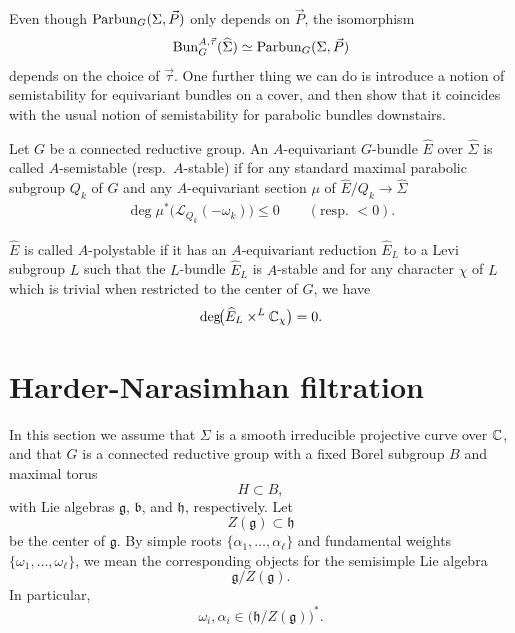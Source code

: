 \documentclass[12pt]{article}
\begin{document}
Even though \(\operatorname{Parbun}_G(\Sigma,\vec P)\) only depends on \(\vec P\), the isomorphism
\[
\operatorname{Bun}^{A,\vec\tau}_G(\widehat\Sigma)
\simeq
\operatorname{Parbun}_G(\Sigma,\vec P)
\]
depends on the choice of \(\vec\tau\). One further thing we can do is introduce a notion of semistability for equivariant bundles on a cover, and then show that it coincides with the usual notion of semistability for parabolic bundles downstairs. 

\begin{definition}
Let $G$ be a connected reductive group. An $A$-equivariant $G$-bundle $\widehat E$ over $\widehat\Sigma$ is called $A$-semistable (resp.\ $A$-stable) if for any standard maximal parabolic subgroup $Q_k$ of $G$ and any $A$-equivariant section $\mu$ of $\widehat E/Q_k \to \widehat\Sigma$ \begin{align*}
\deg \mu^*\bigl(\mathcal L_{Q_k}(-\omega_k)\bigr) \leq 0
\qquad\left(\text{resp.\ } < 0\right).
\end{align*}

$\widehat E$ is called $A$-polystable if it has an $A$-equivariant reduction $\widehat E_L$ to a Levi subgroup $L$ such that the $L$-bundle $\widehat E_L$ is $A$-stable and for any character $\chi$ of $L$ which is trivial when restricted to the center of $G$, we have
\[
\deg\!\bigl(\widehat E_L \times^L \mathbb{C}_\chi\bigr)=0.
\]
\end{definition}

\section{Harder-Narasimhan filtration}
In this section we assume that \(\Sigma\) is a smooth irreducible projective curve over \(\mathbb{C}\), and that \(G\) is a connected reductive group with a fixed Borel subgroup \(B\) and maximal torus
\[
H\subset B,
\]
with Lie algebras \(\mathfrak g\), \(\mathfrak b\), and \(\mathfrak h\), respectively. Let
\[
Z(\mathfrak g)\subset \mathfrak h
\]
be the center of \(\mathfrak g\). By simple roots \(\{\alpha_1,\dots,\alpha_\ell\}\) and fundamental weights \(\{\omega_1,\dots,\omega_\ell\}\), we mean the corresponding objects for the semisimple Lie algebra
\[
\mathfrak g/Z(\mathfrak g).
\]
In particular,
\[
\omega_i,\alpha_i\in \bigl(\mathfrak h/Z(\mathfrak g)\bigr)^*.
\]
\end{document}
